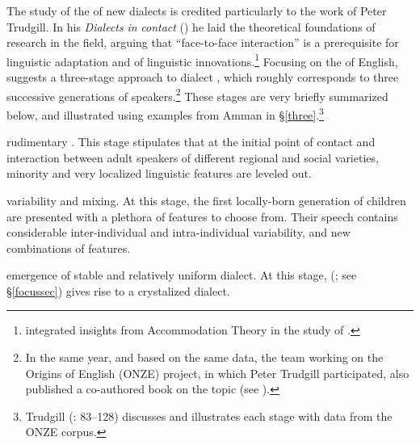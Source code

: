 \documentclass[output=paper]{langsci/langscibook}
\begin{document}
The study of the  of new dialects is credited particularly to the work of Peter Trudgill. In his \textit{Dialects} \textit{in} \textit{contact} (\citeyear{Trudgill1986}) he laid the theoretical foundations of research in the field, arguing that ``face-to-face interaction'' is a prerequisite for linguistic adaptation and  of linguistic innovations.\footnote{\citet{Trudgill1986} integrated insights from Accommodation Theory \citep{Giles1973} in the study of .} Focusing on the  of  {English}, \citet{Trudgill2004} suggests a three-stage approach to dialect , which roughly corresponds to three successive generations of speakers.\footnote{In the same year, and based on the same data, the team working on the Origins of  {English} (ONZE) project, in which Peter Trudgill participated, also published a co-authored book on the topic (see \citealt{GordonEtAl2004}).} These stages are very briefly summarized below, and illustrated using examples from Amman in §\ref{three}.\footnote{Trudgill (\citeyear{Trudgill2004}: 83–128) discusses and illustrates each stage with data from the ONZE corpus.}

\begin{description}[font=\normalfont]
\item[Stage I (first generation):] rudimentary . This stage stipulates that at the initial point of contact and interaction between adult speakers of different regional and social varieties, minority and very localized linguistic features are leveled out.
\item[Stage II (second generation):] variability and mixing. At this stage, the first lo\-cal\-ly-born generation of children are presented with a plethora of features to choose from. Their speech contains considerable inter-individual and intra-individual variability, and new combinations of features.
\item[Stage III (third generation):] emergence of stable and relatively uniform dialect. At this stage,  (\citealt{LePageTabouret-Keller1985}; see §\ref{focussec}) gives rise to a crystalized dialect. 
\end{description}
\end{document}
